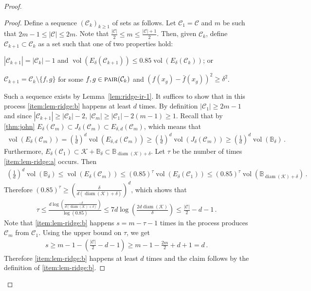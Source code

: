 \documentclass[letter, 12pt]{report}
\newcommand{\pair}{\operatorname{\textsc{pair}}}
\newcommand{\ball}{\mathbb{B}}
\newcommand{\cK}{\mathcal K}
\newcommand{\cC}{\mathcal C}
\newcommand{\vol}{\operatorname{vol}}
\newcommand{\diam}{\operatorname{diam}}
\newcommand{\1}{\mathbf{1}}
\theoremstyle{plain}
\theoremstyle{definition}
\theoremstyle{remark}
\begin{document}
\begin{proof}
    \begin{proof}
        Define a sequence $(\cC_k)_{k\geq1}$ of sets as follows.
        Let $\cC_1 = \cC$ and $m$ be such that $2m -1 \leq |\cC| \leq 2m$.
        Note that $\tfrac{|\cC|}{2} \leq m \leq \tfrac{|\cC|+1}{2}$.
        Then, given $\cC_k$, define $\cC_{k+1} \subset \cC_k$ as a set such that one of two properties hold:
        \begin{enumroman}
            \item $|\cC_{k+1}| = |\cC_k| - 1$ and $\vol(E_\delta(\cC_{k+1})) \leq 0.85 \vol(E_\delta(\cC_k))$; or \label{item:lem-ridge:a}
            \item $\cC_{k+1} = \cC_k \setminus \{f, g\}$ for some $f, g \in \pair(\cC_k)$ and $(f(x_g) - \bar f(x_g))^2 \geq \delta^2$. \label{item:lem-ridge:b}
        \end{enumroman}
        Such a sequence exists by Lemma~\ref{lem:ridge-ir-1}.
        It suffices to show that  in this process \ref{item:lem-ridge:b} happens at least $d$ times.
        By definition $|\cC_1| \geq 2m-1$ and since $|\cC_{k+1}| \geq |\cC_k| - 2$, $|\cC_m| \geq |\cC_1| - 2(m-1) \geq 1$.
        Recall that by \cref{thm:john} $E_\delta(\cC_m) \subset J_\delta(\cC_m) \subset E_{\delta,d}(\cC_m)$, which means that
        \begin{align*}
            \vol(E_\delta(\cC_m))
            = \left(\frac{1}{d}\right)^d \vol(E_{\delta,d}(\cC_m))
            \geq \left(\frac{1}{d}\right)^d \vol(J_\delta(\cC_m))
            \geq \left(\frac{1}{d}\right)^d \vol(\ball_\delta) \,.
        \end{align*}
        Furthermore, $E_\delta(\cC_1) \subset \cK + \ball_\delta \subset \ball_{\diam(\cK) + \delta}$.
        Let $\tau$ be the number of times \ref{item:lem-ridge:a} occurs. Then
        \begin{align*}
            \left(\frac{1}{d}\right)^d \vol(\ball_\delta) \leq \vol(E_\delta(\cC_m)) \leq (0.85)^\tau \vol(E_\delta(\cC_1)) \leq (0.85)^\tau \vol(\ball_{\diam(\cK)+\delta})\,.
        \end{align*}
        Therefore $(0.85)^\tau \geq \left(\frac{\delta}{d(\diam(\cK) + \delta)}\right)^d$,
        which shows that
        \begin{align*}
            \tau
            \leq \frac{d \log\left(\frac{-\delta}{d(\diam(\cK) + \delta)}\right)}{\log(0.85)}
            \leq 7 d \log\left(\frac{2d \diam(\cK)}{\delta}\right)
            \leq \frac{|\cC|}{2} - d - 1\,.
        \end{align*}
        Note that \ref{item:lem-ridge:b} happens $s = m-\tau - 1$ times in the process produces $\cC_m$ from $\cC_1$.
        Using the upper bound on $\tau$, we get
        \begin{align*}
            s \geq m - 1 - \left(\tfrac{|\cC|}{2} - d - 1\right)
            \geq m - 1 - \tfrac{2m}{2} + d + 1
            = d\,.
        \end{align*}
        Therefore \ref{item:lem-ridge:b} happens at least $d$ times and the claim follows by the definition of \ref{item:lem-ridge:b}.
    \end{proof}


\end{proof}
\end{document}
